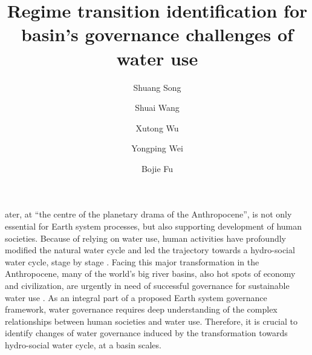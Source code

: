 \documentclass[9pt, twocolumn, twoside, lineno]{pnas-new}
\title{Regime transition identification for basin's governance challenges of water use}
\author[a, b]{Shuang Song}  %
\author[a, b, 1]{Shuai Wang}  %
\author[c, d]{Xutong Wu}  %
\author[e]{Yongping Wei} %
\author[a, b]{Bojie Fu}  %
\affil[a]{ %
	State Key Laboratory of Earth Surface Processes and Resource Ecology, 
	Faculty of Geographical Science, 
	Beijing Normal University, 
	Beijing 100875, 
	P.R. China
}
\affil[b]{ %
	Institute of Land Surface System and Sustainability, 
	Faculty of Geographical Science, 
	Beijing Normal University, 
	Beijing 100875, 
	P.R. China
}
\affil[c]{ %
	College of Urban and Environmental Sciences, 
	Peking University, 
	Beijing 100871, 
	P.R. China
}
\affil[d]{ %
	State Key Laboratory of Urban and Regional Ecology, 
	Research Center for Eco-Environmental Sciences, 
	Chinese Academy of Sciences, 
	Beijing 100085, 
	P.R. China 
}
\affil[e]{ %
	School of Earth and Environmental Sciences, 
	The University of Queensland, 
	Brisbane 4067, 
	Australia
}
\begin{document}
\maketitle
\thispagestyle{firststyle}

\label{introduction-section-1}
ater, at “the centre of the planetary drama of the Anthropocene”, is not only essential for Earth system processes, but also supporting development of human societies. 
Because of relying on water use, human activities have profoundly modified the natural water cycle and led the trajectory towards a hydro-social water cycle, stage by stage
\cite{gleesonIlluminatingWaterCycle2020,cummingLinkingEconomicGrowth2018}.
Facing this major transformation in the Anthropocene, many of the world's big river basins, also hot spots of economy and civilization, are urgently in need of successful governance for sustainable water use
\cite{bestAnthropogenicStressesWorld2019}. 
As an integral part of a proposed Earth system governance framework, water governance requires deep understanding of the complex relationships between human societies and water use.
Therefore, it is crucial to identify changes of water governance induced by the transformation towards hydro-social water cycle, at a basin scales.
\end{document}
